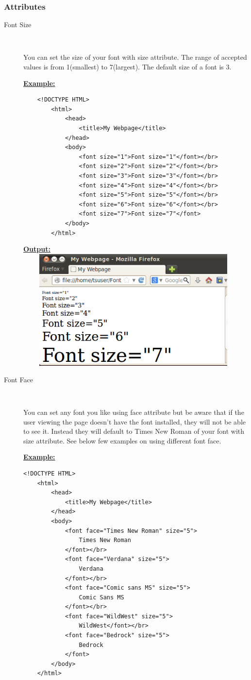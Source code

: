 \documentclass[11pt,a4paper]{article}
\begin{document}
\subsubsection*{Attributes}
\begin{description}
\item[Font Size]\
 
You can set the size of your font with size attribute. The range of accepted values is from 1(smallest) to 7(largest). The default size of a font is 3.\

\underline{\textbf{Example:}}
\begin{verbatim}
    <!DOCTYPE HTML>
        <html>
            <head>
                <title>My Webpage</title>
            </head>
            <body>
                <font size="1">Font size="1"</font></br>
                <font size="2">Font size="2"</font></br>
                <font size="3">Font size="3"</font></br>
                <font size="4">Font size="4"</font></br>
                <font size="5">Font size="5"</font></br>
                <font size="6">Font size="6"</font></br>
                <font size="7">Font size="7"</font>
            </body>
        </html>
\end{verbatim}

\underline{\textbf{Output:}} \\
\includegraphics[height = 61mm, width = 120mm]{FontSize.png}\

\item[Font Face]\

You can set any font you like using face attribute but be aware that if the user viewing the page doesn't have the font installed, they will not be able to see it. Instead they will default to Times New Roman of your font with size attribute. See below few examples on using different font face.\

\underline{\textbf{Example:}}
\begin{verbatim}
<!DOCTYPE HTML>
    <html>
        <head>
            <title>My Webpage</title>
        </head>
        <body>
            <font face="Times New Roman" size="5">
                Times New Roman
            </font></br>
            <font face="Verdana" size="5">
                Verdana
            </font></br>
            <font face="Comic sans MS" size="5">
                Comic Sans MS
            </font></br>
            <font face="WildWest" size="5">
                WildWest</font></br>
            <font face="Bedrock" size="5">
                Bedrock
            </font>
        </body>
    </html>
\end{verbatim}


\end{description}
\end{document}
